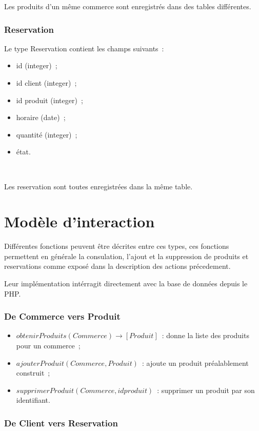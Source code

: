 \documentclass[a4paper,12pt]{article}
\begin{document}
Les produits d'un même commerce sont enregistrés dans des tables différentes.

\subsubsection{Reservation}

Le type Reservation contient les champs suivants~:
\begin{itemize}
	\item id (integer)~;
	\item id client (integer)~;
	\item id produit (integer)~;
	\item horaire (date)~;
	\item quantité (integer)~;
	\item état.
\end{itemize} \

Les reservation sont toutes enregistrées dans la même table.

\section{Modèle d'interaction}

Différentes fonctions peuvent être décrites entre ces types, ces fonctions permettent en générale la consulation, l'ajout et la suppression de produits et reservations comme exposé dans la description des actions précedement.

Leur implémentation intérragit directement avec la base de données depuis le PHP.

\subsubsection{De Commerce vers Produit}

\begin{itemize}
	\item $obtenirProduits(Commerce) \rightarrow [Produit]$~: donne la liste des produits pour un commerce~;
	\item $ajouterProduit(Commerce, Produit)$~: ajoute un produit préalablement construit~;
	\item $supprimerProduit(Commerce, idproduit)$~: supprimer un produit par son identifiant.
\end{itemize}

\subsubsection{De Client vers Reservation}
\end{document}
